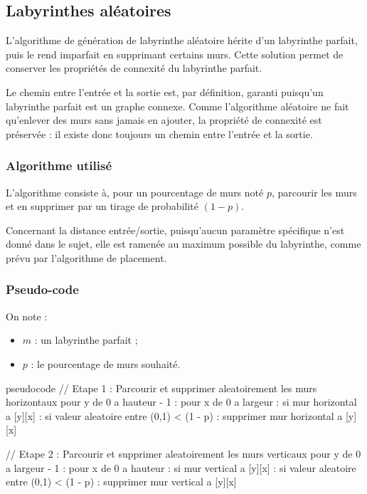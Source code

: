 \documentclass{butexFR}
\begin{document}
\newpage
\subsection{Labyrinthes aléatoires}

L'algorithme de génération de labyrinthe aléatoire hérite d'un labyrinthe parfait, puis le rend imparfait en supprimant certains murs. Cette solution permet de conserver les propriétés de connexité du labyrinthe parfait.

Le chemin entre l'entrée et la sortie est, par définition, garanti puisqu'un labyrinthe parfait est un graphe connexe. Comme l'algorithme aléatoire ne fait qu'enlever des murs sans jamais en ajouter, la propriété de connexité est préservée : il existe donc toujours un chemin entre l'entrée et la sortie.

\subsubsection{Algorithme utilisé}

L'algorithme consiste à, pour un pourcentage de murs noté \( p \), parcourir les murs et en supprimer par un tirage de probabilité $(1 - p)$.

Concernant la distance entrée/sortie, puisqu'aucun paramètre spécifique n'est donné dans le sujet, elle est ramenée au maximum possible du labyrinthe, comme prévu par l'algorithme de placement.

\subsubsection{Pseudo-code}

On note :
\begin{itemize}
\item \( m \) : un labyrinthe parfait ;
\item \( p \) : le pourcentage de murs souhaité.
\end{itemize}

\begin{codeboxlang}{pseudocode}
// Etape 1 : Parcourir et supprimer aleatoirement les murs horizontaux
pour y de 0 a hauteur - 1 :
    pour x de 0 a largeur :
        si mur horizontal a [y][x] :
            si valeur aleatoire entre (0,1) < (1 - p) :
                supprimer mur horizontal a [y][x]

// Etape 2 : Parcourir et supprimer aleatoirement les murs verticaux
pour y de 0 a largeur - 1 :
    pour x de 0 a hauteur :
        si mur vertical a [y][x] :
            si valeur aleatoire entre (0,1) < (1 - p) :
                supprimer mur vertical a [y][x]
\end{codeboxlang}
\end{document}

